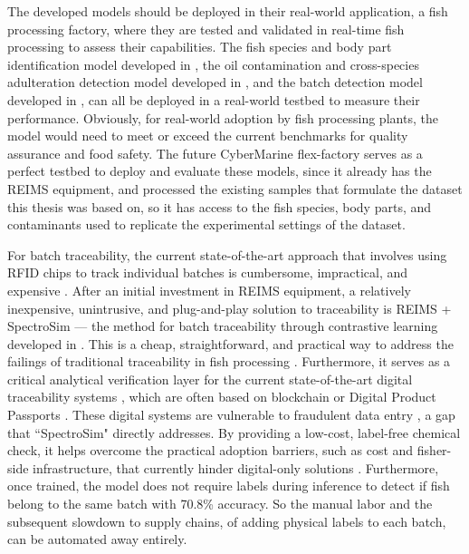 The developed models should be deployed in their real-world application, a fish processing factory, where they are tested and validated in real-time fish processing to assess their capabilities.
The fish species and body part identification model developed in , the oil contamination and cross-species adulteration detection model developed in , and the batch detection model developed in , can all be deployed in a real-world testbed to measure their performance. Obviously, for real-world adoption by fish processing plants, the model would need to meet or exceed the current benchmarks for quality assurance and food safety. The future CyberMarine flex-factory \citep{PFR2020} serves as a perfect testbed to deploy and evaluate these models, since it already has the REIMS equipment, and processed the existing samples that formulate the dataset this thesis was based on, so it has access to the fish species, body parts, and contaminants used to replicate the experimental settings of the dataset.

For batch traceability, the current state-of-the-art approach that involves using RFID chips to track individual batches is cumbersome, impractical, and expensive \citep{Mai2010}.
After an initial investment in REIMS equipment, a relatively inexpensive, unintrusive, and plug-and-play solution to traceability is REIMS + SpectroSim --- the method for batch traceability through contrastive learning developed in . This is a cheap, straightforward, and practical way to address the failings of traditional traceability in fish processing \citep{Helyar2014}. Furthermore, it serves as a critical analytical verification layer for the current state-of-the-art digital traceability systems \citep{Gastaldi2025}, which are often based on blockchain \citep{dahariya2025enhancing} or Digital Product Passports \citep{jiang2025traceability}. These digital systems are vulnerable to fraudulent data entry \citep{turkson2025digital}, a gap that ``SpectroSim" directly addresses. By providing a low-cost, label-free chemical check, it helps overcome the practical adoption barriers, such as cost and fisher-side infrastructure, that currently hinder digital-only solutions \citep{Untal2025}. Furthermore, once trained, the model does not require labels during inference to detect if fish belong to the same batch with 70.8\% accuracy. So the manual labor and the subsequent slowdown to supply chains, of adding physical labels to each batch, can be automated away entirely.

